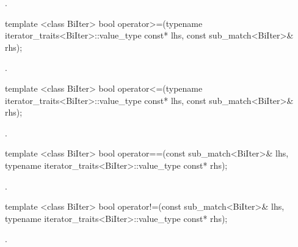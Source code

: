\begin{itemdescr}
\pnum\returns  {}.
\end{itemdescr}

%
%
\begin{itemdecl}
template <class BiIter> 
  bool operator>=(typename iterator_traits<BiIter>::value_type const* lhs, 
                  const sub_match<BiIter>& rhs); 
\end{itemdecl}

\begin{itemdescr}
\pnum\returns  {}.
\end{itemdescr}

%
%
\begin{itemdecl}
template <class BiIter> 
  bool operator<=(typename iterator_traits<BiIter>::value_type const* lhs, 
                  const sub_match<BiIter>& rhs); 
\end{itemdecl}

\begin{itemdescr}
\pnum\returns  {}.
\end{itemdescr}

%
%
\begin{itemdecl}
template <class BiIter> 
  bool operator==(const sub_match<BiIter>& lhs, 
                  typename iterator_traits<BiIter>::value_type const* rhs);
\end{itemdecl}

\begin{itemdescr}
\pnum\returns  {}.
\end{itemdescr}

%
%
\begin{itemdecl}
template <class BiIter> 
  bool operator!=(const sub_match<BiIter>& lhs, 
                  typename iterator_traits<BiIter>::value_type const* rhs); 
\end{itemdecl}

\begin{itemdescr}
\pnum\returns  {}.
\end{itemdescr}

